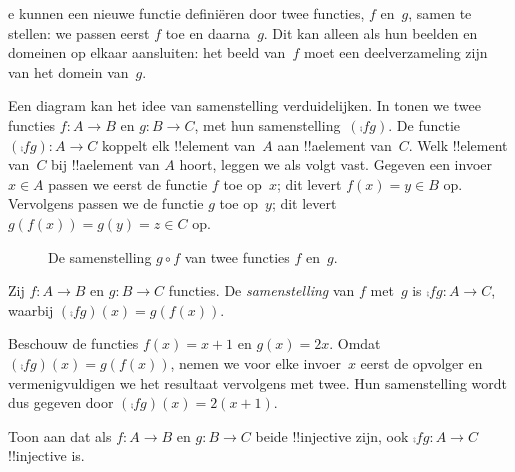 \documentclass[openany]{memoir}
\begin{document}

\begin{explain}
e kunnen een nieuwe
functie definiëren door twee functies, $f$ en~$g$, samen te stellen:
we passen eerst $f$ toe en daarna~$g$. Dit kan alleen als hun beelden
en domeinen op elkaar aansluiten: het beeld van~$f$ moet een
deelverzameling zijn van het domein van~$g$.

Een diagram kan het idee van samenstelling verduidelijken. In
 tonen we twee functies $f \colon A \to B$ en
$g \colon B \to C$, met hun samenstelling~$(\comp{f}{g})$. De functie
$(\comp{f}{g}) \colon A \to C$ koppelt elk !!{element} van~$A$ aan
!!a{element} van~$C$. Welk !!{element} van~$C$ bij !!a{element} van
$A$ hoort, leggen we als volgt vast. Gegeven een invoer $x \in A$
passen we eerst de functie $f$ toe op~$x$; dit levert $f(x) = y \in B$
op. Vervolgens passen we de functie $g$ toe op~$y$; dit levert
$g(f(x)) = g(y) = z \in C$ op.
\begin{figure}
  \caption{De samenstelling $g \circ f$ van twee functies $f$ en~$g$.}
\end{figure}
\end{explain}

\begin{defn}[Samenstelling]
Zij $f\colon A \to B$ en $g\colon B \to C$ functies. De
\emph{samenstelling} van $f$ met~$g$ is $\comp{f}{g} \colon A \to C$,
waarbij $(\comp{f}{g})(x) = g(f(x))$.
\end{defn}

\begin{ex}
Beschouw de functies $f(x) = x + 1$ en $g(x) = 2x$. Omdat
$(\comp{f}{g})(x) = g(f(x))$, nemen we voor elke invoer~$x$ eerst de
opvolger en vermenigvuldigen we het resultaat vervolgens met twee. Hun
samenstelling wordt dus gegeven door $(\comp{f}{g})(x) = 2(x+1)$.
\end{ex}

\begin{prob}
Toon aan dat als $f \colon A \to B$ en $g \colon B \to C$ beide
!!{injective} zijn, ook $\comp{f}{g}\colon A \to C$ !!{injective} is.
\end{prob}
\end{document}

